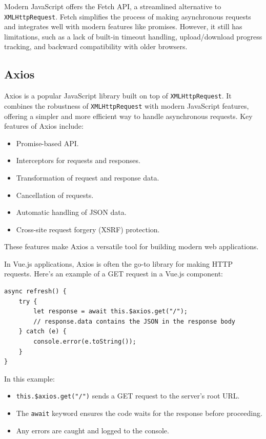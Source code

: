 Modern JavaScript offers the Fetch API, a streamlined alternative to \texttt{XMLHttpRequest}. Fetch simplifies the process of making asynchronous requests and integrates well with modern features like promises. However, it still has limitations, such as a lack of built-in timeout handling, upload/download progress tracking, and backward compatibility with older browsers.

\subsection*{Axios}
Axios is a popular JavaScript library built on top of \texttt{XMLHttpRequest}. It combines the robustness of \texttt{XMLHttpRequest} with modern JavaScript features, offering a simpler and more efficient way to handle asynchronous requests. Key features of Axios include:
\begin{itemize}
    \item Promise-based API.
    \item Interceptors for requests and responses.
    \item Transformation of request and response data.
    \item Cancellation of requests.
    \item Automatic handling of JSON data.
    \item Cross-site request forgery (XSRF) protection.
\end{itemize}
These features make Axios a versatile tool for building modern web applications.

In Vue.js applications, Axios is often the go-to library for making HTTP requests. Here's an example of a GET request in a Vue.js component:

\begin{verbatim}
async refresh() {
    try {
        let response = await this.$axios.get("/");
        // response.data contains the JSON in the response body
    } catch (e) {
        console.error(e.toString());
    }
}
\end{verbatim}
In this example:
\begin{itemize}
    \item \texttt{this.\$axios.get("/")} sends a GET request to the server's root URL.
    \item The \texttt{await} keyword ensures the code waits for the response before proceeding.
    \item Any errors are caught and logged to the console.
\end{itemize}

